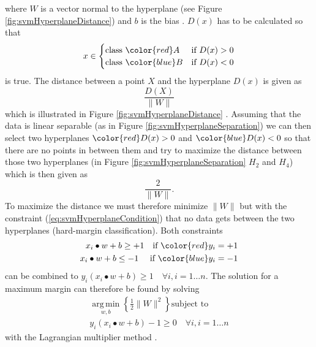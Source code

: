 where $W$ is a vector normal to the hyperplane (see Figure \ref{fig:svmHyperplaneDistance}) and $b$ is the bias \cite{Boser1992}. $D(x)$ has to be calculated so that
\begin{equation}
	x \in 
	\begin{cases}
	\text{class } {\color{red}A} & \text{if } D(x) > 0 \\
	\text{class } {\color{blue}B} & \text{if } D(x) < 0
	\end{cases}	
\end{equation}
is true. The distance between a point $X$ and the hyperplane $D(x)$ is given as
\begin{equation}
\frac{D(X)}{\|W\|}
\end{equation}
which is illustrated in Figure \ref{fig:svmHyperplaneDistance} \cite{Thome2012}. Assuming that the data is linear separable {(as in Figure \ref{fig:svmHyperplaneSeparation})} we can then select two hyperplanes ${\color{red}D(x)>0}$ and ${\color{blue}D(x)<0}$ so that there are no points in between them and try to maximize the distance between those two hyperplanes {(in Figure \ref{fig:svmHyperplaneSeparation} $H_2$ and $H_4$)} which is then given as 
\begin{equation}
\frac{2}{\|W\|}.
\end{equation}
To maximize the distance we must therefore minimize $\|W\|$ but with the constraint {(\ref{eq:svmHyperplaneCondition})} that no data gets between the two hyperplanes {(hard-margin classification)}. Both constraints
\begin{equation}
	\begin{split}
	x_i \bullet w+b \geq +1 \quad \text{if } {\color{red}y_i=+1}\\
	x_i \bullet w+b \leq -1 \quad \text{ if } {\color{blue}y_i=-1}
	\end{split}
\label{eq:svmHyperplaneCondition}
\end{equation}
can be combined to $y_i(x_i\bullet w + b)\geq 1\quad \forall i, i=1\dots n$. The solution for a maximum margin can therefore be found by solving
\begin{equation}
\begin{split}
\operatorname*{arg\,min}_{w, b}	\left\{\frac{1}{2}\|W\|^2\right\} \text{subject to} \\
y_i(x_i\bullet w + b)-1\geq 0 \quad \forall i, i=1\dots n	
\end{split}
\end{equation}
with the Lagrangian multiplier method \cite{Thome2012}. 

